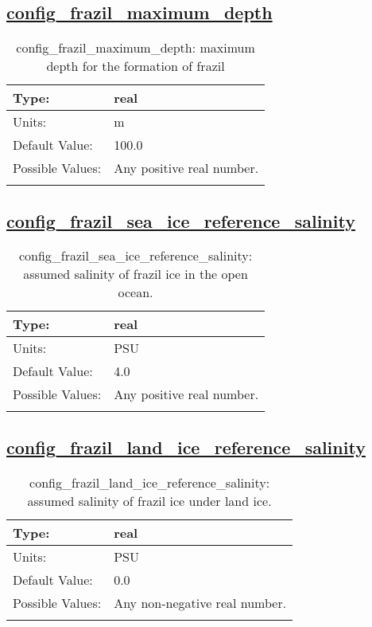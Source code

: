 \subsection[config\_frazil\_maximum\_depth]{\hyperref[sec:nm_tab_frazil_ice]{config\_frazil\_maximum\_depth}}
\label{subsec:nm_sec_config_frazil_maximum_depth}
\begin{center}
\begin{longtable}{| p{2.0in} || p{4.0in} |}
    \hline
    Type: & real \\
    \hline
    Units: & \si{m} \\
    \hline
    Default Value: & 100.0 \\
    \hline
    Possible Values: & Any positive real number. \\
    \hline
    \caption{config\_frazil\_maximum\_depth: maximum depth for the formation of frazil}
\end{longtable}
\end{center}
\subsection[config\_frazil\_sea\_ice\_reference\_salinity]{\hyperref[sec:nm_tab_frazil_ice]{config\_frazil\_sea\_ice\_reference\_salinity}}
\label{subsec:nm_sec_config_frazil_sea_ice_reference_salinity}
\begin{center}
\begin{longtable}{| p{2.0in} || p{4.0in} |}
    \hline
    Type: & real \\
    \hline
    Units: & \si{PSU} \\
    \hline
    Default Value: & 4.0 \\
    \hline
    Possible Values: & Any positive real number. \\
    \hline
    \caption{config\_frazil\_sea\_ice\_reference\_salinity: assumed salinity of frazil ice in the open ocean.}
\end{longtable}
\end{center}
\subsection[config\_frazil\_land\_ice\_reference\_salinity]{\hyperref[sec:nm_tab_frazil_ice]{config\_frazil\_land\_ice\_reference\_salinity}}
\label{subsec:nm_sec_config_frazil_land_ice_reference_salinity}
\begin{center}
\begin{longtable}{| p{2.0in} || p{4.0in} |}
    \hline
    Type: & real \\
    \hline
    Units: & \si{PSU} \\
    \hline
    Default Value: & 0.0 \\
    \hline
    Possible Values: & Any non-negative real number. \\
    \hline
    \caption{config\_frazil\_land\_ice\_reference\_salinity: assumed salinity of frazil ice under land ice.}
\end{longtable}
\end{center}

